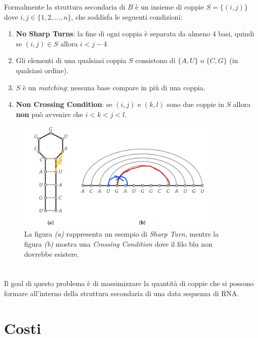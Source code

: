 Formalmente la struttura secondaria di $B$ è un insieme di coppie $S =
    \{(i,j)\}$ dove $i,j \in \{1,2,\ldots,n\}$, che soddisfa le seguenti
condizioni:

\begin{enumerate}
    \item \textbf{No Sharp Turns}: la fine di ogni coppia è separata da almeno 4
          basi, quindi se $(i,j) \in S$ allora $i < j - 4$
    \item Gli elementi di una qualsiasi coppia $S$ consistono di $\{A, U\}$ o
          $\{C, G\}$ (in qualsiasi ordine).
    \item $S$ è un \textit{matching}: nessuna base compare in più di una coppia.
    \item \textbf{Non Crossing Condition}: se $(i, j)$ e $(k,l)$ sono due coppie
          in $S$ allora \textbf{non} può avvenire che $i < k < j < l$.
\end{enumerate}

\begin{figure}[H]
    \centering
    \includegraphics[width=10cm, keepaspectratio]{capitoli/imgs/rna_esempio2.png}
    \caption{La figura \textit{(a)} rappresenta un esempio di \textit{Sharp
            Turn}, mentre la figura \textit{(b)} mostra una
        \textit{Crossing Condition} dove il filo blu non dovrebbe esistere.}
\end{figure}

\section{\goal}

Il goal di questo problema è di massimizzare la quantità di coppie che si possono
formare all'interno della struttura secondaria di una data sequenza di RNA.

\section{Costi}

